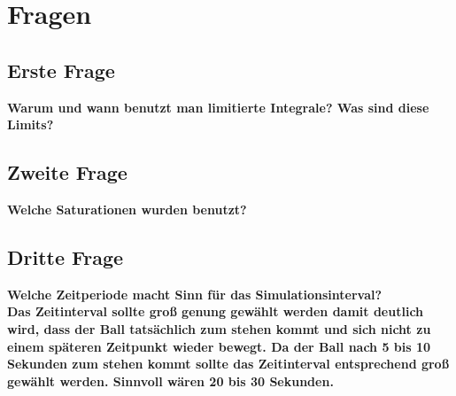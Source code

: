 \section{Fragen}
\subsection{Erste Frage}
\bfseries Warum und wann benutzt man limitierte Integrale? Was sind diese Limits? \\
\mdseries

\subsection{Zweite Frage}
\bfseries Welche Saturationen wurden benutzt? \\
\mdseries

\subsection{Dritte Frage}
\bfseries Welche Zeitperiode macht Sinn für das Simulationsinterval? \\
\mdseries Das Zeitinterval sollte groß genung gewählt werden damit deutlich wird, dass der Ball tatsächlich zum stehen kommt und sich nicht zu einem späteren Zeitpunkt wieder bewegt. Da der Ball nach 5 bis 10 Sekunden zum stehen kommt sollte das Zeitinterval entsprechend groß gewählt werden. Sinnvoll wären 20 bis 30 Sekunden.
